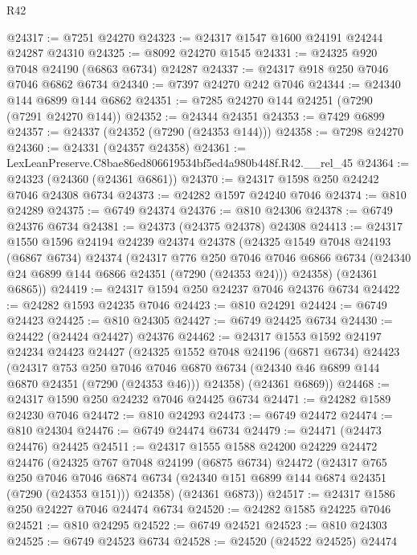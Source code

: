 \begin{lexlean}{R42}
\begin{coremodule}
{@24317 := @7251 @24270
@24323 := @24317 @1547 @1600 @24191 @24244 @24287 @24310
@24325 := @8092 @24270 @1545
@24331 := @24325 @920 @7048 @24190 (@6863 @6734) @24287
@24337 := @24317 @918 @250 @7046 @7046 @6862 @6734
@24340 := @7397 @24270 @242 @7046
@24344 := @24340 @144 @6899 @144 @6862
@24351 := @7285 @24270 @144 @24251 (@7290 (@7291 @24270 @144))
@24352 := @24344 @24351
@24353 := @7429 @6899
@24357 := @24337 (@24352 (@7290 (@24353 @144)))
@24358 := @7298 @24270
@24360 := @24331 (@24357 @24358)
@24361 := LexLeanPreserve.C8bae86ed806619534bf5ed4a980b448f.R42.__rel_45
@24364 := @24323 (@24360 (@24361 @6861))
@24370 := @24317 @1598 @250 @24242 @7046 @24308 @6734
@24373 := @24282 @1597 @24240 @7046
@24374 := @810 @24289
@24375 := @6749 @24374
@24376 := @810 @24306
@24378 := @6749 @24376 @6734
@24381 := @24373 (@24375 @24378) @24308
@24413 := @24317
    @1550
    @1596
    @24194
    @24239
    @24374
    @24378
    (@24325
      @1549
      @7048
      @24193
      (@6867 @6734)
      @24374
      (@24317
        @776
        @250
        @7046
        @7046
        @6866
        @6734
        (@24340 @24 @6899 @144 @6866 @24351 (@7290 (@24353 @24)))
        @24358)
      (@24361 @6865))
@24419 := @24317 @1594 @250 @24237 @7046 @24376 @6734
@24422 := @24282 @1593 @24235 @7046
@24423 := @810 @24291
@24424 := @6749 @24423
@24425 := @810 @24305
@24427 := @6749 @24425 @6734
@24430 := @24422 (@24424 @24427) @24376
@24462 := @24317
    @1553
    @1592
    @24197
    @24234
    @24423
    @24427
    (@24325
      @1552
      @7048
      @24196
      (@6871 @6734)
      @24423
      (@24317
        @753
        @250
        @7046
        @7046
        @6870
        @6734
        (@24340 @46 @6899 @144 @6870 @24351 (@7290 (@24353 @46)))
        @24358)
      (@24361 @6869))
@24468 := @24317 @1590 @250 @24232 @7046 @24425 @6734
@24471 := @24282 @1589 @24230 @7046
@24472 := @810 @24293
@24473 := @6749 @24472
@24474 := @810 @24304
@24476 := @6749 @24474 @6734
@24479 := @24471 (@24473 @24476) @24425
@24511 := @24317
    @1555
    @1588
    @24200
    @24229
    @24472
    @24476
    (@24325
      @767
      @7048
      @24199
      (@6875 @6734)
      @24472
      (@24317
        @765
        @250
        @7046
        @7046
        @6874
        @6734
        (@24340 @151 @6899 @144 @6874 @24351 (@7290 (@24353 @151)))
        @24358)
      (@24361 @6873))
@24517 := @24317 @1586 @250 @24227 @7046 @24474 @6734
@24520 := @24282 @1585 @24225 @7046
@24521 := @810 @24295
@24522 := @6749 @24521
@24523 := @810 @24303
@24525 := @6749 @24523 @6734
@24528 := @24520 (@24522 @24525) @24474
}
\end{coremodule}
\end{lexlean}

